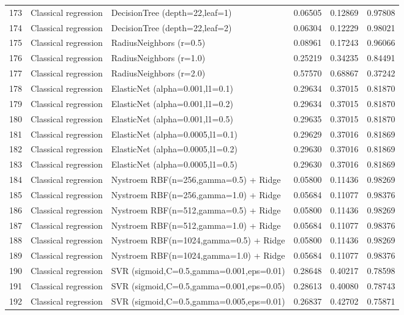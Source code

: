 \documentclass[10pt]{article}
\begin{document}
\begin{longtable}{C{0.75cm}L{2.35cm}L{8.0cm}C{1.15cm}C{1.15cm}C{1.15cm}}
173 & Classical regression & DecisionTree (depth=22,leaf=1) & 0.06505 & 0.12869 & 0.97808 \\
174 & Classical regression & DecisionTree (depth=22,leaf=2) & 0.06304 & 0.12229 & 0.98021 \\
175 & Classical regression & RadiusNeighbors (r=0.5) & 0.08961 & 0.17243 & 0.96066 \\
176 & Classical regression & RadiusNeighbors (r=1.0) & 0.25219 & 0.34235 & 0.84491 \\
177 & Classical regression & RadiusNeighbors (r=2.0) & 0.57570 & 0.68867 & 0.37242 \\
178 & Classical regression & ElasticNet (alpha=0.001,l1=0.1) & 0.29634 & 0.37015 & 0.81870 \\
179 & Classical regression & ElasticNet (alpha=0.001,l1=0.2) & 0.29634 & 0.37015 & 0.81870 \\
180 & Classical regression & ElasticNet (alpha=0.001,l1=0.5) & 0.29635 & 0.37015 & 0.81870 \\
181 & Classical regression & ElasticNet (alpha=0.0005,l1=0.1) & 0.29629 & 0.37016 & 0.81869 \\
182 & Classical regression & ElasticNet (alpha=0.0005,l1=0.2) & 0.29630 & 0.37016 & 0.81869 \\
183 & Classical regression & ElasticNet (alpha=0.0005,l1=0.5) & 0.29630 & 0.37016 & 0.81869 \\
184 & Classical regression & Nystroem RBF(n=256,gamma=0.5) + Ridge & 0.05800 & 0.11436 & 0.98269 \\
185 & Classical regression & Nystroem RBF(n=256,gamma=1.0) + Ridge & 0.05684 & 0.11077 & 0.98376 \\
186 & Classical regression & Nystroem RBF(n=512,gamma=0.5) + Ridge & 0.05800 & 0.11436 & 0.98269 \\
187 & Classical regression & Nystroem RBF(n=512,gamma=1.0) + Ridge & 0.05684 & 0.11077 & 0.98376 \\
188 & Classical regression & Nystroem RBF(n=1024,gamma=0.5) + Ridge & 0.05800 & 0.11436 & 0.98269 \\
189 & Classical regression & Nystroem RBF(n=1024,gamma=1.0) + Ridge & 0.05684 & 0.11077 & 0.98376 \\
190 & Classical regression & SVR (sigmoid,C=0.5,gamma=0.001,eps=0.01) & 0.28648 & 0.40217 & 0.78598 \\
191 & Classical regression & SVR (sigmoid,C=0.5,gamma=0.001,eps=0.05) & 0.28613 & 0.40080 & 0.78743 \\
192 & Classical regression & SVR (sigmoid,C=0.5,gamma=0.005,eps=0.01) & 0.26837 & 0.42702 & 0.75871 \\

\end{longtable}
\end{document}
